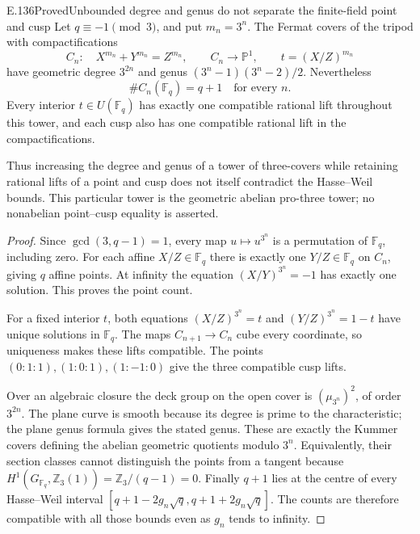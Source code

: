 \begin{result}{E.136}{Proved}{Unbounded degree and genus do not separate the finite-field point and cusp}
Let $q\equiv-1\pmod3$, and put $m_n=3^n$.
The Fermat covers of the tripod with compactifications
\[
 C_n:\quad X^{m_n}+Y^{m_n}=Z^{m_n},
 \qquad C_n\longrightarrow\mathbb P^1,
 \qquad t=(X/Z)^{m_n}
\]
have geometric degree $3^{2n}$ and genus
$(3^n-1)(3^n-2)/2$. Nevertheless
\[
                         \#C_n(\mathbb F_q)=q+1
                         \quad\text{for every }n.
\]
Every interior $t\in U(\mathbb F_q)$ has exactly one
compatible rational lift throughout this tower, and
each cusp also has one compatible rational lift in
the compactifications.

Thus increasing the degree and genus of a tower of
three-covers while retaining rational lifts of a point
and cusp does not itself contradict the Hasse--Weil
bounds. This particular tower is the geometric
abelian pro-three tower; no nonabelian point--cusp
equality is asserted.
\end{result}
\begin{proof}
Since $\gcd(3,q-1)=1$, every map
$u\mapsto u^{3^n}$ is a permutation of
$\mathbb F_q$, including zero. For each affine
$X/Z\in\mathbb F_q$ there is exactly one
$Y/Z\in\mathbb F_q$ on $C_n$, giving $q$
affine points. At infinity the equation
$(X/Y)^{3^n}=-1$ has exactly one solution.
This proves the point count.

For a fixed interior $t$, both equations
$(X/Z)^{3^n}=t$ and $(Y/Z)^{3^n}=1-t$
have unique solutions in $\mathbb F_q$.
The maps $C_{n+1}\to C_n$ cube every coordinate,
so uniqueness makes these lifts compatible.
The points $(0:1:1),(1:0:1),(1:-1:0)$ give
the three compatible cusp lifts.

Over an algebraic closure the deck group on the
open cover is $(\mu_{3^n})^2$, of order $3^{2n}$.
The plane curve is smooth because its degree is
prime to the characteristic; the plane genus
formula gives the stated genus. These are exactly
the Kummer covers defining the abelian geometric
quotients modulo $3^n$. Equivalently, their
section classes cannot distinguish the points
from a tangent because
$H^1(G_{\mathbb F_q},\mathbb Z_3(1))
=\mathbb Z_3/(q-1)=0$.
Finally $q+1$ lies at the centre of every
Hasse--Weil interval
$[q+1-2g_n\sqrt q,q+1+2g_n\sqrt q]$.
The counts are therefore compatible with all
those bounds even as $g_n$ tends to infinity.
\end{proof}


